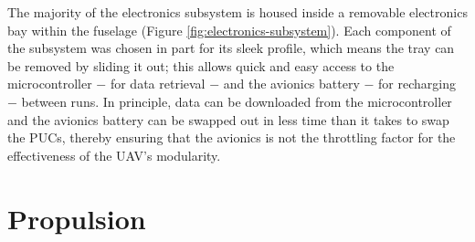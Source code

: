 \documentclass[../../main.tex]{subfiles}
\begin{document}


%    

The majority of the electronics subsystem is housed inside a removable electronics bay within the fuselage (Figure \ref{fig:electronics-subsystem}).
Each component of the subsystem was chosen in part for its sleek profile, which means the tray can be removed by sliding it out; this allows quick and easy access to the microcontroller $-$ for data retrieval $-$ and the avionics battery $-$ for recharging $-$ between runs.
In principle, data can be downloaded from the microcontroller and the avionics battery can be swapped out in less time than it takes to swap the PUCs, thereby ensuring that the avionics is not the throttling factor for the effectiveness of the UAV's modularity.

\section{Propulsion} \label{sec:final-design-proposal:propulsion}

\end{document}
